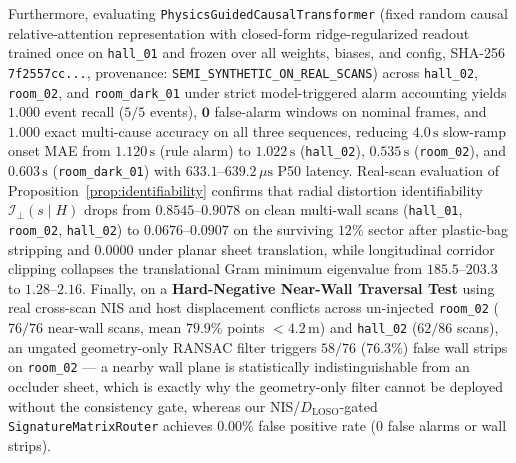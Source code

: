\documentclass[journal]{IEEEtran}
\begin{document}
Furthermore, evaluating \texttt{PhysicsGuided\allowbreak Causal\allowbreak Transformer} (fixed random causal relative-attention representation with closed-form ridge-regularized readout trained once on \texttt{hall\_01} and frozen over all weights, biases, and config, SHA-256 \texttt{7f2557cc...}, provenance: \texttt{SEMI\_\allowbreak SYNTHETIC\_\allowbreak ON\_\allowbreak REAL\_\allowbreak SCANS}) across \texttt{hall\_02}, \texttt{room\_02}, and \texttt{room\_dark\_01} under strict model-triggered alarm accounting yields $\mathbf{1.000}$ event recall ($5/5$ events), $\mathbf{0}$ false-alarm windows on nominal frames, and $\mathbf{1.000}$ exact multi-cause accuracy on all three sequences, reducing $4.0\,\mathrm{s}$ slow-ramp onset MAE from $1.120\,\mathrm{s}$ (rule alarm) to $\mathbf{1.022\,\mathrm{s}}$ (\texttt{hall\_02}), $\mathbf{0.535\,\mathrm{s}}$ (\texttt{room\_02}), and $\mathbf{0.603\,\mathrm{s}}$ (\texttt{room\_dark\_01}) with $633.1\text{--}639.2\,\mu\mathrm{s}$ P50 latency. Real-scan evaluation of Proposition~\ref{prop:identifiability} confirms that radial distortion identifiability $\mathcal{I}_\perp(s \mid H)$ drops from $\mathbf{0.8545\text{--}0.9078}$ on clean multi-wall scans (\texttt{hall\_01}, \texttt{room\_02}, \texttt{hall\_02}) to $\mathbf{0.0676\text{--}0.0907}$ on the surviving $12\%$ sector after plastic-bag stripping and $\mathbf{0.0000}$ under planar sheet translation, while longitudinal corridor clipping collapses the translational Gram minimum eigenvalue from $185.5\text{--}203.3$ to $\mathbf{1.28\text{--}2.16}$. Finally, on a \textbf{Hard-Negative Near-Wall Traversal Test} using real cross-scan NIS and host displacement conflicts across un-injected \texttt{room\_02} ($76/76$ near-wall scans, mean $79.9\%$ points $<4.2\,\mathrm{m}$) and \texttt{hall\_02} ($62/86$ scans), an ungated geometry-only RANSAC filter triggers $58/76$ ($76.3\%$) false wall strips on \texttt{room\_02} --- a nearby wall plane is statistically indistinguishable from an occluder sheet, which is exactly why the geometry-only filter cannot be deployed without the consistency gate, whereas our NIS/$D_{\mathrm{LOSO}}$-gated \texttt{Signature\allowbreak Matrix\allowbreak Router} achieves $\mathbf{0.00\%}$ false positive rate ($0$ false alarms or wall strips).
\end{document}
